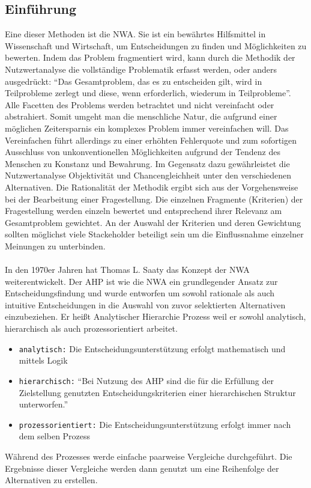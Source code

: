 \subsection{Einführung}
Eine dieser Methoden ist die \ac{NWA}. Sie ist ein bewährtes Hilfsmittel in Wissenschaft und Wirtschaft, um Entscheidungen zu finden und Möglichkeiten zu bewerten. Indem das Problem fragmentiert wird, kann durch die Methodik der Nutzwertanalyse die vollständige Problematik erfasst werden, oder anders ausgedrückt: \enquote{Das Gesamtproblem, das es zu entscheiden gilt, wird in Teilprobleme zerlegt und diese, wenn erforderlich, wiederum in Teilprobleme}\autocite[S.1]{Kuehnapfel.2014}. Alle Facetten des Problems werden betrachtet und nicht vereinfacht oder abstrahiert. Somit umgeht man die menschliche Natur, die aufgrund einer möglichen Zeitersparnis ein komplexes Problem immer vereinfachen will. Das Vereinfachen führt allerdings zu einer erhöhten Fehlerquote und zum sofortigen Ausschluss von unkonventionellen Möglichkeiten aufgrund der Tendenz des Menschen zu Konstanz und Bewahrung\autocite[Vgl.][S.1]{Kuehnapfel.2014}. Im Gegensatz dazu gewährleistet die Nutzwertanalyse Objektivität und Chancengleichheit unter den verschiedenen Alternativen.\newline
Die Rationalität der Methodik ergibt sich aus der Vorgehensweise bei der Bearbeitung einer Fragestellung. Die einzelnen Fragmente (Kriterien) der Fragestellung werden einzeln bewertet und entsprechend ihrer Relevanz am Gesamtproblem gewichtet.\autocite[Vgl.][S.10]{Kuehnapfel.2014} An der Auswahl der Kriterien und deren Gewichtung sollten möglichst viele Stackeholder beteiligt sein um die Einflussnahme einzelner Meinungen zu unterbinden.\\
\\
In den 1970er Jahren hat Thomas L. Saaty das Konzept der \ac{NWA} weiterentwickelt. Der \ac{AHP} ist wie die \ac{NWA} ein grundlegender Ansatz zur Entscheidungsfindung und wurde entworfen um sowohl rationale als auch intuitive Entscheidungen in die Auswahl von zuvor selektierten Alternativen einzubeziehen.\autocite[Vgl.][S.1]{Saaty.2012} Er heißt Analytischer Hierarchie Prozess weil er sowohl analytisch, hierarchisch als auch prozessorientiert arbeitet.\autocite{TUM.2015}
\begin{itemize}
	\item\texttt{analytisch:} Die Entscheidungsunterstützung erfolgt mathematisch und mittels Logik
	\item\texttt{hierarchisch:} \enquote{Bei Nutzung des AHP sind die für die Erfüllung der Zielstellung genutzten Entscheidungskriterien einer hierarchischen Struktur unterworfen.}\autocite[S.314]{Hausladen.2016} 
	\item\texttt{prozessorientiert:} Die Entscheidungsunterstützung erfolgt immer nach dem selben Prozess
\end{itemize}
Während des Prozesses werde einfache paarweise Vergleiche durchgeführt. Die Ergebnisse dieser Vergleiche werden dann genutzt um eine Reihenfolge der Alternativen zu erstellen.\autocite[Vgl.][S.1]{Saaty.2012}
